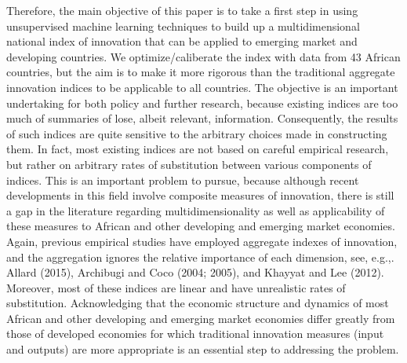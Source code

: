 \documentclass[11pt]{article}
\begin{document}
Therefore, the main objective of this paper is to take a first step in using unsupervised machine learning techniques to build up a multidimensional national index of innovation that can be applied to emerging market and developing countries. We optimize/caliberate the index with data from 43 African countries, but the aim is to make it more rigorous than the traditional aggregate innovation indices to be applicable to all countries. The objective is an important undertaking for both policy and further research, because existing indices are too much of summaries of lose, albeit relevant, information. Consequently, the results of such indices are quite sensitive to the arbitrary choices made in constructing them. In fact, most existing indices are not based on careful empirical research, but rather on arbitrary rates of substitution between various components of indices. This is an important problem to pursue, because although recent developments in this field involve composite measures of innovation, there is still a gap in the literature regarding multidimensionality as well as applicability of these measures to African and other developing and emerging market economies. Again, previous empirical studies have employed aggregate indexes of innovation, and the aggregation ignores the relative importance of each dimension, see, e.g.,. Allard (2015), Archibugi and Coco (2004; 2005), and Khayyat and Lee (2012).  Moreover, most of these indices are linear and have unrealistic rates of substitution. Acknowledging that the economic structure and dynamics of most African and other developing and emerging market economies differ greatly from those of developed economies for which traditional innovation measures (input and outputs) are more appropriate is an essential step to addressing the problem. 
\end{document}
